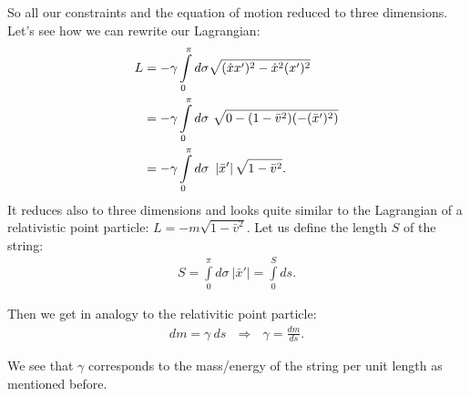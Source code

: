 So all our constraints and the equation of motion reduced to three dimensions.
Let's see how we can rewrite our Lagrangian:
\begin{align}
L &= - \gamma \displaystyle\int\limits_{0}^{\pi} d\sigma \sqrt{(\dot{x}x')^2 - \dot{x}^2(x')^2} \notag \\
&= - \gamma \displaystyle\int\limits_{0}^{\pi} d\sigma \ \sqrt{0 - (1 - \bar{v}^2) (- (\bar{x}')^2)} \notag \\
&= - \gamma \displaystyle\int\limits_{0}^{\pi} d\sigma \ \left| \bar{x}' \right|  \sqrt{1 - \bar{v}^2}.
\end{align}
It reduces also to three dimensions and looks quite similar to the Lagrangian of a relativistic point particle: $L = - m \sqrt{1 - \bar{v}^2}$. Let us define the length $S$ of the string:
\begin{align}
S = \displaystyle\int\limits_{0}^{\pi} d\sigma \ \left| \bar{x}' \right| = \displaystyle\int\limits_{0}^{S} ds.
\end{align} 

Then we get in analogy to the relativitic point particle:
\begin{align}
dm = \gamma \ ds \ \ \ \Longrightarrow \ \ \ \gamma = \frac{dm}{ds}.
\end{align}

We see that $\gamma$ corresponds to the mass/energy of the string per unit length as mentioned before. 
